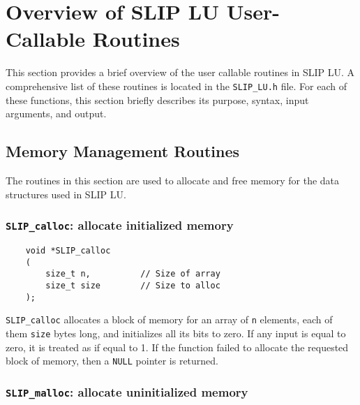\documentclass[12pt]{article}
\theoremstyle{definition}
\begin{document}
\cprotect\section{Overview of SLIP LU User-Callable Routines}
\label{s:UserRoutines}

This section provides a brief overview of the user callable routines in SLIP
LU. A comprehensive list of these routines is located in the \verb|SLIP_LU.h|
file. For each of these functions, this section briefly describes its purpose,
syntax, input arguments, and output.

\subsection{Memory Management Routines} \label{s:user:memmanag}

The routines in this section are used to allocate and free memory for the data
structures used in SLIP LU.

\cprotect\subsubsection{\verb|SLIP_calloc|: allocate initialized memory}
\label{ss:SLIP_calloc}

\begin{mdframed}[userdefinedwidth=6in]
{\footnotesize
\begin{verbatim}
    void *SLIP_calloc
    (
        size_t n,          // Size of array
        size_t size        // Size to alloc
    );
\end{verbatim}
} \end{mdframed}

\verb|SLIP_calloc| allocates a block of memory for an array of \verb|n|
elements, each of them \verb|size| bytes long, and initializes all its bits to
zero.  If any input is equal to zero, it is treated as if equal to 1.  If the
function failed to allocate the requested block of memory, then a \verb|NULL|
pointer is returned.

\cprotect\subsubsection{\verb|SLIP_malloc|: allocate uninitialized memory}
\label{ss:SLIP_malloc}
\end{document}
